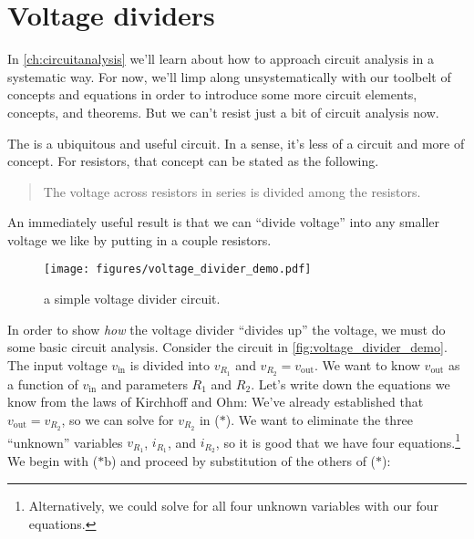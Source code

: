 \documentclass[electronics.tex]{subfiles}
\begin{document}
\section{Voltage dividers}
\tags{}
\label{lec:voltage_dividers}

In \autoref{ch:circuitanalysis} we'll learn about how to approach circuit analysis in a systematic way.
For now, we'll limp along unsystematically with our toolbelt of concepts and equations in order to introduce some more circuit elements, concepts, and theorems.
But we can't resist just a bit of circuit analysis now.
\tags{}

The  is a ubiquitous and useful circuit.
In a sense, it's less of a circuit and more of concept.
For resistors, that concept can be stated as the following.
\begin{quote}
  The voltage across resistors in series is divided among the resistors.
\end{quote}

An immediately useful result is that we can ``divide voltage'' into any smaller voltage we like by putting in a couple resistors.
\begin{figure}[b]
  \centering
  \texttt{[image: figures/voltage\_divider\_demo.pdf]}
  \caption{a simple voltage divider circuit.}
  \label{fig:voltage_divider_demo}
\end{figure}

In order to show \emph{how} the voltage divider ``divides up'' the voltage, we must do some basic circuit analysis.
Consider the circuit in \autoref{fig:voltage_divider_demo}.
The input voltage $v_\text{in}$ is divided into $v_{R_1}$ and $v_{R_2} = v_\text{out}$.
We want to know $v_\text{out}$ as a function of $v_\text{in}$ and parameters $R_1$ and $R_2$.
Let's write down the equations we know from the laws of Kirchhoff and Ohm:
%
We've already established that $v_\text{out} = v_{R_2}$, so we can solve for $v_{R_2}$ in ($*$).
We want to eliminate the three ``unknown'' variables $v_{R_1}$, $i_{R_1}$, and $i_{R_2}$, so it is good that we have four equations.\footnote{Alternatively, we could solve for all four unknown variables with our four equations.}
We begin with ($*$b) and proceed by substitution of the others of ($*$):
\end{document}
